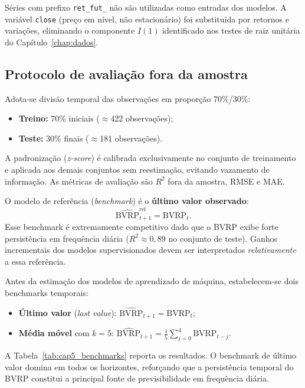 Séries com prefixo \texttt{ret\_fut\_} não são utilizadas como entradas dos modelos.
A variável \texttt{close} (preço em nível, não estacionário) foi substituída por
retornos e variações, eliminando o componente $I(1)$ identificado nos testes de raiz
unitária do Capítulo~\ref{chap:dados}.

\subsection{Protocolo de avaliação fora da amostra}
\label{subsec:cap5_protocolo}

Adota-se divisão temporal das observações em proporção 70\%/30\%:

\begin{itemize}
    \item \textbf{Treino:} 70\% iniciais ($\approx$422 observações);
    \item \textbf{Teste:} 30\% finais ($\approx$181 observações).
\end{itemize}

A padronização (\textit{z-score}) é calibrada exclusivamente no conjunto de
treinamento e aplicada aos demais conjuntos sem reestimação, evitando vazamento
de informação. As métricas de avaliação são $R^2$ fora da amostra, RMSE e MAE.

O modelo de referência (\textit{benchmark}) é o \textbf{último valor observado}:
\begin{equation}
\widehat{\text{BVRP}}_{t+1}^{\text{ref}} = \text{BVRP}_t.
\end{equation}
Esse benchmark é extremamente competitivo dado que o BVRP exibe forte persistência
em frequência diária ($R^2 \approx 0{,}89$ no conjunto de teste). Ganhos incrementais
dos modelos supervisionados devem ser interpretados \textit{relativamente} a essa
referência.

Antes da estimação dos modelos de aprendizado de máquina, estabelecem-se dois
benchmarks temporais:

\begin{itemize}
    \item \textbf{Último valor} (\textit{last value}):
    $\widehat{\text{BVRP}}_{t+1} = \text{BVRP}_t$;
    \item \textbf{Média móvel} com $k = 5$:
    $\widehat{\text{BVRP}}_{t+1} = \frac{1}{5}\sum_{j=0}^{4}\text{BVRP}_{t-j}$.
\end{itemize}

A Tabela~\ref{tab:cap5_benchmarks} reporta os resultados. O benchmark de último
valor domina em todos os horizontes, reforçando que a persistência temporal do
BVRP constitui a principal fonte de previsibilidade em frequência diária.

